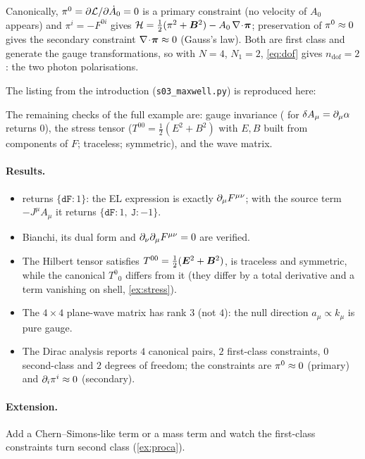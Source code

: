 Canonically, $\pi^0=\partial\mathcal L/\partial\dot A_0=0$ is a primary constraint (no velocity of $A_0$ appears) and $\pi^i=-F^{0i}$ gives $\mathcal H=\tfrac12(\pi^2+\bm{B}^2)-A_0\,\nabla\!\cdot\!\bm{\pi}$; preservation of $\pi^0\approx0$ gives the secondary constraint $\nabla\!\cdot\!\bm{\pi}\approx0$ (Gauss's law). Both are first class and generate the gauge transformations, so with $N=4$, $N_1=2$, \cref{eq:dof} gives $n_{\mathrm{dof}}=2$: the two photon polarisations.

The listing from the introduction (\texttt{s03\_maxwell.py}) is reproduced here:

The remaining checks of the full example are: gauge invariance ( for $\delta A_\mu=\partial_\mu\alpha$ returns $0$), the stress tensor ($T^{00}=\tfrac12(E^2+B^2)$ with $E,B$ built from components of $F$; traceless; symmetric), and the wave matrix.

\paragraph{Results.}
\begin{itemize}[nosep]
\item {} returns $\{\texttt{dF}: 1\}$: the EL expression is exactly $\partial_\mu F^{\mu\nu}$; with the source term $-J^\mu A_\mu$ it returns $\{\texttt{dF}:1,\ \texttt{J}:-1\}$.
\item Bianchi, its dual form and $\partial_\nu\partial_\mu F^{\mu\nu}=0$ are verified.
\item The Hilbert tensor satisfies $T^{00}=\tfrac12(\bm{E}^2+\bm{B}^2)$, is traceless and symmetric, while the canonical $T^0{}_0$ differs from it (they differ by a total derivative and a term vanishing on shell, \cref{ex:stress}).
\item The $4\times4$ plane-wave matrix has rank $3$ (not $4$): the null direction $a_\mu\propto k_\mu$ is pure gauge.
\item The Dirac analysis reports $4$ canonical pairs, $2$ first-class constraints, $0$ second-class and $2$ degrees of freedom; the constraints are $\pi^0\approx0$ (primary) and $\partial_i\pi^i\approx0$ (secondary).
\end{itemize}

\paragraph{Extension.} Add a Chern--Simons-like term or a mass term and watch the first-class constraints turn second class (\cref{ex:proca}).

